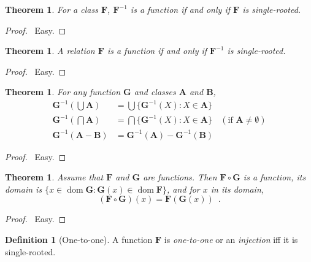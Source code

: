\documentclass{article}
\let\qed\relax
\newtheorem{theorem}[axiom]{Theorem}
\theoremstyle{definition}
\newtheorem{definition}[axiom]{Definition}
\newcommand{\dom}{\ensuremath{\operatorname{dom}}}
\newcommand{\inv}[1]{\ensuremath{{#1}^{-1}}}
\begin{document}
    \begin{theorem}
        For a class $\mathbf{F}$, $\inv{\mathbf{F}}$ is a function if and only if $\mathbf{F}$ is single-rooted.
    \end{theorem}

    \begin{proof}
        \pf\ Easy. \qed
    \end{proof}

    \begin{theorem}
        A relation $\mathbf{F}$ is a function if and only if $\inv{\mathbf{F}}$ is single-rooted.
    \end{theorem}

    \begin{proof}
        \pf\ Easy. \qed
    \end{proof}

    \begin{theorem}
        For any function $\mathbf{G}$ and classes $\mathbf{A}$ and $\mathbf{B}$,
        \begin{align*}
            \inv{\mathbf{G}}(\bigcup \mathbf{A}) & = \bigcup \{ \inv{\mathbf{G}}(X) : X \in \mathbf{A} \} \\
            \inv{\mathbf{G}}(\bigcap \mathbf{A}) & = \bigcap \{ \inv{\mathbf{G}}(X) : X \in \mathbf{A} \} &
            (\text{if } \mathbf{A} \neq \emptyset) \\
            \inv{\mathbf{G}}(\mathbf{A} - \mathbf{B}) & = \inv{\mathbf{G}}(\mathbf{A}) - \inv{\mathbf{G}}(\mathbf{B})
        \end{align*}
    \end{theorem}

    \begin{proof}
        \pf\ Easy. \qed
    \end{proof}

    \begin{theorem}
        Assume that $\mathbf{F}$ and $\mathbf{G}$ are functions. Then $\mathbf{F} \circ \mathbf{G}$
        is a function, its domain is $\{ x \in \dom \mathbf{G} : \mathbf{G}(x) \in \dom \mathbf{F} \}$,
        and for $x$ in its domain,
        \[ (\mathbf{F} \circ \mathbf{G})(x) = \mathbf{F}(\mathbf{G}(x)) \enspace . \]
    \end{theorem}

    \begin{proof}
        \pf\ Easy. \qed
    \end{proof}

    \begin{definition}[One-to-one]
        A function $\mathbf{F}$ is \emph{one-to-one} or an \emph{injection} iff it is single-rooted.
    \end{definition}
\end{document}
